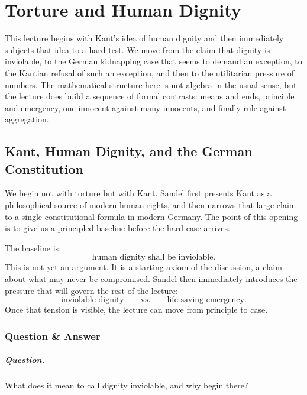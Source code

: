 \chapter{Torture and Human Dignity}

This lecture begins with Kant's idea of human dignity and then immediately subjects that idea to a hard test. We move from the claim that dignity is inviolable, to the German kidnapping case that seems to demand an exception, to the Kantian refusal of such an exception, and then to the utilitarian pressure of numbers. The mathematical structure here is not algebra in the usual sense, but the lecture does build a sequence of formal contrasts: means and ends, principle and emergency, one innocent against many innocents, and finally rule against aggregation.

\section{Kant, Human Dignity, and the German Constitution}

We begin not with torture but with Kant. Sandel first presents Kant as a philosophical source of modern human rights, and then narrows that large claim to a single constitutional formula in modern Germany. The point of this opening is to give us a principled baseline before the hard case arrives.

The baseline is:
\begin{equation}
\text{human dignity shall be inviolable}.
\end{equation}
This is not yet an argument. It is a starting axiom of the discussion, a claim about what may never be compromised. Sandel then immediately introduces the pressure that will govern the rest of the lecture:
\begin{equation}
\text{inviolable dignity}
\qquad \text{vs.} \qquad
\text{life-saving emergency}.
\end{equation}
Once that tension is visible, the lecture can move from principle to case.

\subsection{Question \& Answer}

\paragraph{Question.} What does it mean to call dignity inviolable, and why begin there?

